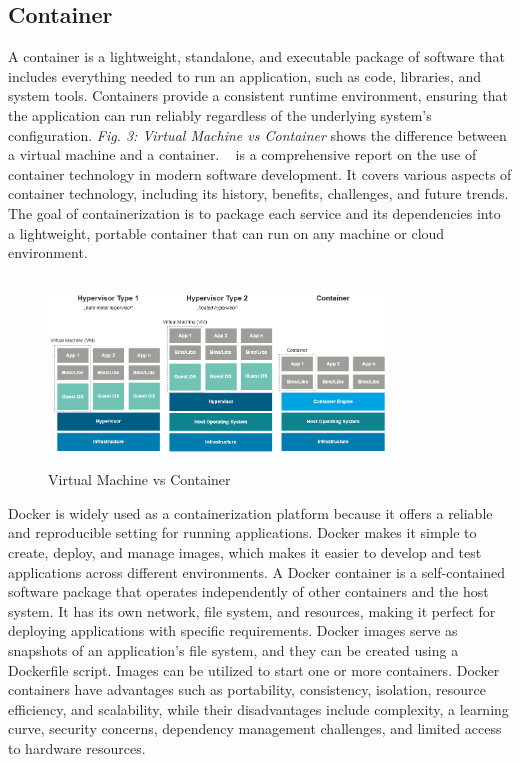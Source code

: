 \subsection{ Container}
A container is a lightweight, standalone, and executable package of software that includes everything needed to run an application, such as code, libraries, and system tools. Containers provide a consistent runtime environment, ensuring that the application can run reliably regardless of the underlying system's configuration. \emph{Fig. 3: Virtual Machine vs Container} shows the difference between a virtual machine and a container.
~\cite{siddiq2014comprehen} is a comprehensive report on the use of container technology in modern software development. It covers various aspects of container technology, including its history, benefits, challenges, and future trends. The goal of containerization is to package each service and its dependencies into a lightweight, portable container that can run on any machine or cloud environment. 

\begin{figure}
\centering
\includegraphics[width=9cm, height=5cm]{vitualmachine-vs-dockercontainer}
\caption{Virtual Machine vs Container}
\end{figure}

Docker is widely used as a containerization platform because it offers a reliable and reproducible setting for running applications. Docker makes it simple to create, deploy, and manage images, which makes it easier to develop and test applications across different environments. A Docker container is a self-contained software package that operates independently of other containers and the host system. It has its own network, file system, and resources, making it perfect for deploying applications with specific requirements. Docker images serve as snapshots of an application's file system, and they can be created using a Dockerfile script. Images can be utilized to start one or more containers. Docker containers have advantages such as portability, consistency, isolation, resource efficiency, and scalability, while their disadvantages include complexity, a learning curve, security concerns, dependency management challenges, and limited access to hardware resources.

